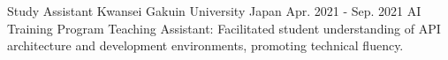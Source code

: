\begin{cventries}
\cventry
  {Study Assistant} %
  {Kwansei Gakuin University} %
  {Japan} %
  {Apr. 2021 - Sep. 2021} %
  {
      AI Training Program Teaching Assistant: Facilitated student understanding of API architecture and development environments, promoting technical fluency.
  }

\end{cventries}
